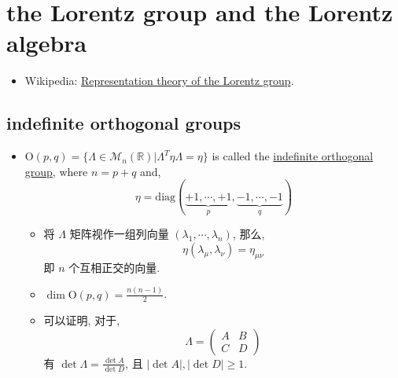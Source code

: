 \chapter{the Lorentz group and the Lorentz algebra}
\begin{itemize}
	\item Wikipedia: \href{https://en.wikipedia.org/wiki/Representation_theory_of_the_Lorentz_group}{Representation theory of the Lorentz group}.
\end{itemize}

\section{indefinite orthogonal groups}
\begin{itemize}
	\item $\mathrm{O}(p, q) = \{\Lambda \in \mathcal{M}_n(\mathbb{R}) | \Lambda^T \eta \Lambda = \eta\}$ is called the \href{https://en.wikipedia.org/wiki/Indefinite_orthogonal_group}{indefinite orthogonal group}, where $n = p + q$ and,
	\begin{equation}
		\eta = \mathrm{diag}(\underbrace{+ 1, \cdots, + 1}_{p}, \underbrace{- 1, \cdots, - 1}_{q})
	\end{equation}
	\begin{itemize}
		\item 将 $\Lambda$ 矩阵视作一组列向量 $(\lambda_1, \cdots, \lambda_n)$, 那么,
		\begin{equation}
			\eta(\lambda_\mu, \lambda_\nu) = \eta_{\mu \nu}
		\end{equation}
		即 $n$ 个互相正交的向量.
		
		\item $\dim \mathrm{O}(p, q) = \frac{n (n - 1)}{2}$.
		
		\item 可以证明, 对于,
		\begin{equation}
			\Lambda = \begin{pmatrix}
				A & B \\
				C & D
			\end{pmatrix}
		\end{equation}
		有 $\det \Lambda = \frac{\det A}{\det D}$, 且 $|\det A|, |\det D| \geq 1$.
		

\end{itemize}
\end{itemize}
